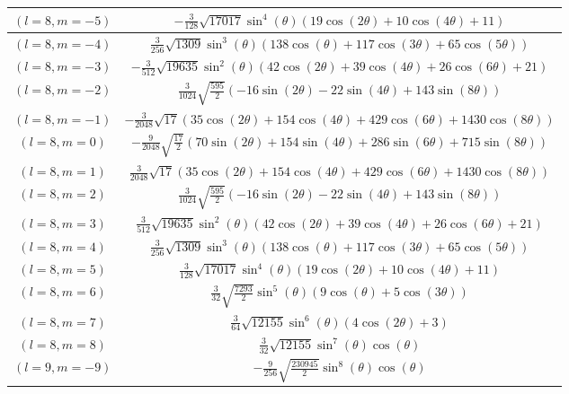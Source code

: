 \begin{center}
\begin{longtable}{|c|c|}
\rowcolor{gray!15}
$(l=8, m=-5)$ & $-\frac{3}{128} \sqrt{17017} \sin ^4(\theta ) (19 \cos (2 \theta )+10 \cos (4 \theta )+11)$ \\ \hline
$(l=8, m=-4)$ & $\frac{3}{256} \sqrt{1309} \sin ^3(\theta ) (138 \cos (\theta )+117 \cos (3 \theta )+65 \cos (5 \theta ))$ \\ \hline
\rowcolor{gray!15}
$(l=8, m=-3)$ & $-\frac{3}{512} \sqrt{19635} \sin ^2(\theta ) (42 \cos (2 \theta )+39 \cos (4 \theta )+26 \cos (6 \theta )+21)$ \\ \hline
$(l=8, m=-2)$ & $\frac{3}{1024} \sqrt{\frac{595}{2}} (-16 \sin (2 \theta )-22 \sin (4 \theta )+143 \sin (8 \theta ))$ \\ \hline
\rowcolor{gray!15}
$(l=8, m=-1)$ & $-\frac{3}{2048} \sqrt{17} (35 \cos (2 \theta )+154 \cos (4 \theta )+429 \cos (6 \theta )+1430 \cos (8 \theta ))$ \\ \hline
$(l=8, m=0)$ & $-\frac{9}{2048} \sqrt{\frac{17}{2}} (70 \sin (2 \theta )+154 \sin (4 \theta )+286 \sin (6 \theta )+715 \sin (8 \theta ))$ \\ \hline
\rowcolor{gray!15}
$(l=8, m=1)$ & $\frac{3}{2048} \sqrt{17} (35 \cos (2 \theta )+154 \cos (4 \theta )+429 \cos (6 \theta )+1430 \cos (8 \theta ))$ \\ \hline
$(l=8, m=2)$ & $\frac{3}{1024} \sqrt{\frac{595}{2}} (-16 \sin (2 \theta )-22 \sin (4 \theta )+143 \sin (8 \theta ))$ \\ \hline
\rowcolor{gray!15}
$(l=8, m=3)$ & $\frac{3}{512} \sqrt{19635} \sin ^2(\theta ) (42 \cos (2 \theta )+39 \cos (4 \theta )+26 \cos (6 \theta )+21)$ \\ \hline
$(l=8, m=4)$ & $\frac{3}{256} \sqrt{1309} \sin ^3(\theta ) (138 \cos (\theta )+117 \cos (3 \theta )+65 \cos (5 \theta ))$ \\ \hline
\rowcolor{gray!15}
$(l=8, m=5)$ & $\frac{3}{128} \sqrt{17017} \sin ^4(\theta ) (19 \cos (2 \theta )+10 \cos (4 \theta )+11)$ \\ \hline
$(l=8, m=6)$ & $\frac{3}{32} \sqrt{\frac{7293}{2}} \sin ^5(\theta ) (9 \cos (\theta )+5 \cos (3 \theta ))$ \\ \hline
\rowcolor{gray!15}
$(l=8, m=7)$ & $\frac{3}{64} \sqrt{12155} \sin ^6(\theta ) (4 \cos (2 \theta )+3)$ \\ \hline
$(l=8, m=8)$ & $\frac{3}{32} \sqrt{12155} \sin ^7(\theta ) \cos (\theta )$ \\ \hline
\rowcolor{gray!15}
$(l=9, m=-9)$ & $-\frac{9}{256} \sqrt{\frac{230945}{2}} \sin ^8(\theta ) \cos (\theta )$ \\ \hline

\end{longtable}
\end{center}
